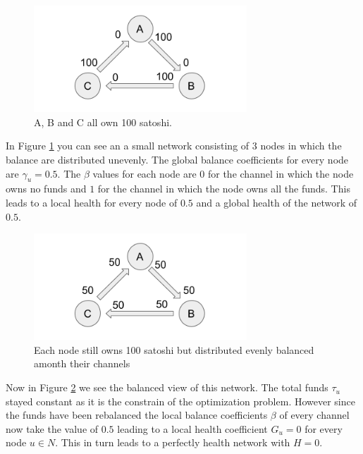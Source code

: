 \documentclass[a4paper]{paper}
\begin{document}
\begin{figure}
 \centering
 \includegraphics[width=8cm]{img/evenUnbalanced.png}
 \caption{A, B and C all own 100 satoshi.}
 \label{fig:evenUnbalanced}
\end{figure}
In Figure \ref{fig:evenUnbalanced} you can see an a small network consisting of $3$ nodes in which the balance are distributed unevenly.
The global balance coefficients for every node are $\gamma_u=0.5$.
The $\beta$ values for each node are $0$ for the channel in which the node owns no funds and $1$ for the channel in which the node owns all the funds.
This leads to a local health for every node of $0.5$ and a global health of the network of $0.5$.
\begin{figure}
 \centering
 \includegraphics[width=8cm]{img/evenBalanced.png}
 \caption{Each node still owns 100 satoshi but distributed evenly balanced amonth their channels}
 \label{fig:evenBalanced}
\end{figure}
Now in Figure \ref{fig:evenBalanced} we see the balanced view of this network.
The total funds $\tau_u$ stayed constant as it is the constrain of the optimization problem.
However since the funds have been rebalanced the local balance coefficients $\beta$ of every channel now take the value of $0.5$ leading to a local health coefficient $G_u=0$ for every node $u\in N$.
This in turn leads to a perfectly health network with $H=0$.
\end{document}
